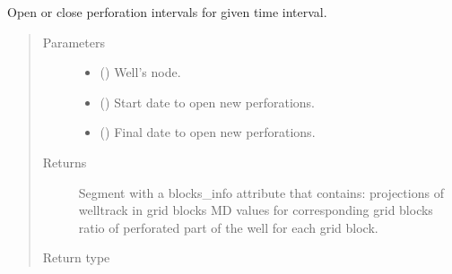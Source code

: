 \documentclass[letterpaper,10pt,english]{sphinxmanual}
\begin{document}
\begin{fulllineitems}
\begin{fulllineitems}
\begin{quote}
\begin{description}
\end{description}\end{quote}

\end{fulllineitems}


\begin{fulllineitems}
\label{\detokenize{api/wells:geology.src.wells.WellSegment.apply_perforations}}
Open or close perforation intervals for given time interval.
\begin{quote}\begin{description}
\item[{Parameters}] \leavevmode\begin{itemize}
\item {} 
 ({\hyperref[\detokenize{api/wells:geology.src.wells.WellSegment}]{}}) \textendash{} Well’s node.

\item {} 
 () \textendash{} Start date to open new perforations.

\item {} 
 () \textendash{} Final date to open new perforations.

\end{itemize}

\item[{Returns}] \leavevmode
{} \textendash{} Segment with a blocks\_info attribute that contains:
\sphinxhyphen{} projections of welltrack in grid blocks
\sphinxhyphen{} MD values for corresponding grid blocks
\sphinxhyphen{} ratio of perforated part of the well for each grid block.

\item[{Return type}] \leavevmode
{\hyperref[\detokenize{api/wells:geology.src.wells.WellSegment}]{}}


\end{description}
\end{quote}
\end{fulllineitems}
\end{fulllineitems}
\end{document}
